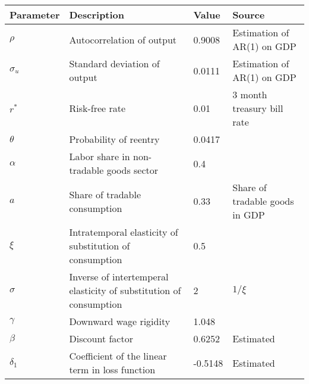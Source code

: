 \begin{table}[h]
    \centering
    \begin{tabular}{@{}llll@{}}
        \toprule
    Parameter  & Description                                                       & Value  & Source                                                                         \\ \midrule
    $\rho$     & Autocorrelation of output                                         & 0.9008  & Estimation of AR(1) on GDP\\
    $\sigma_u$ & Standard deviation of output                                      & 0.0111 & Estimation of AR(1) on GDP\\
    $r^*$      & Risk-free rate                                                    & 0.01 & 3 month treasury bill rate \\
    $\theta$   & Probability of reentry                                            & 0.0417 & \citet*{trebesch-2011-sovereign}                                              \\
    $\alpha$   & Labor share in non-tradable goods sector                          & 0.4   & \citet{Pakistan-DSGE-calibration}                                                       \\
    $a$        & Share of tradable consumption                                     & 0.33   &Share of tradable goods in GDP                    \\
    $\xi$      & Intratemporal elasticity of substitution of consumption & 0.5   & \citet{Na-18}                              \\
    $\sigma$   & Inverse of intertemperal elasticity of substitution of consumption  & 2   & $1 / \xi$                                                                      \\
    $\gamma$   & Downward wage rigidity                                            & 1.048   & \citet*{wage-rigidity-data}                  \\
    $\beta$    & Discount factor                                                   & 0.6252  &  Estimated \\
    $\delta_1$ & Coefficient of the linear term in loss function                   &  -0.5148 &   Estimated  \\

\end{tabular}
\end{table}
